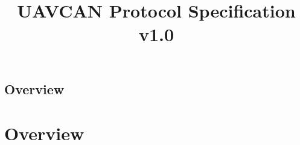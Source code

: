 \documentclass{uavcandoc}
\title{UAVCAN Protocol Specification v1.0}
\begin{document}
\frontmatter

\begin{titlepage}

\section*{Overview}

\end{titlepage}

\tableofcontents
\BeginRightColumn
\listoffigures
\listoftables

\mainmatter

\chapter{Overview}
\end{document}
